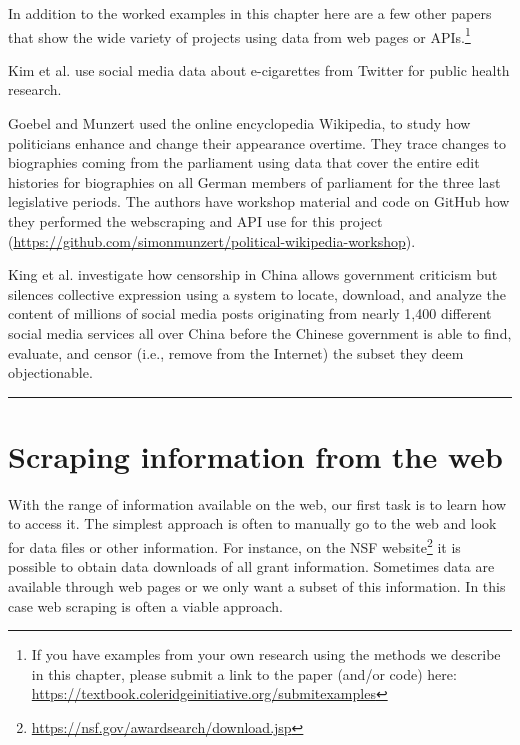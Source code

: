 \documentclass[]{krantz}
\begin{document}
In addition to the worked examples in this chapter here are a few other
papers that show the wide variety of projects using data from web pages
or APIs.\footnote{If you have examples from your own research using the
  methods we describe in this chapter, please submit a link to the paper
  (and/or code) here:
  \url{https://textbook.coleridgeinitiative.org/submitexamples}}

Kim et al. \citeyearpar{Kim2016} use social media data about
e-cigarettes from Twitter for public health research.

Goebel and Munzert \citeyearpar{Goebel2018} used the online encyclopedia
Wikipedia, to study how politicians enhance and change their appearance
overtime. They trace changes to biographies coming from the parliament
using data that cover the entire edit histories for biographies on all
German members of parliament for the three last legislative periods. The
authors have workshop material and code on GitHub how they performed the
webscraping and API use for this project
(\url{https://github.com/simonmunzert/political-wikipedia-workshop}).

King et al. \citeyearpar{King2013} investigate how censorship in China
allows government criticism but silences collective expression using a
system to locate, download, and analyze the content of millions of
social media posts originating from nearly 1,400 different social media
services all over China before the Chinese government is able to find,
evaluate, and censor (i.e., remove from the Internet) the subset they
deem objectionable.

\begin{center}\rule{0.5\linewidth}{\linethickness}\end{center}

\section{Scraping information from the
web}\label{scraping-information-from-the-web}

With the range of information available on the web, our first task is to
learn how to access it. The simplest approach is often to manually go to
the web and look for data files or other information. For instance, on
the NSF website\footnote{\url{https://nsf.gov/awardsearch/download.jsp}}
it is possible to obtain data downloads of all grant information.
Sometimes data are available through web pages or we only want a subset
of this information. In this case web scraping is often a viable
approach.
\end{document}
